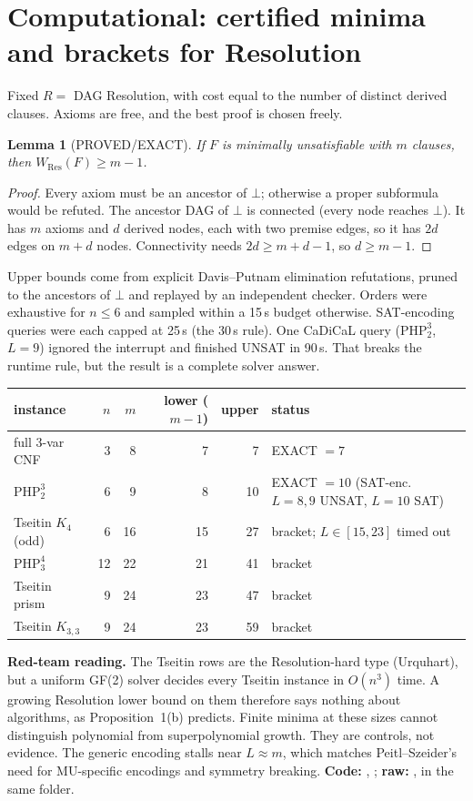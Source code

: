 \documentclass[11pt]{article}
\newtheorem{lemma}{Lemma}
\begin{document}
\section{Computational: certified minima and brackets for Resolution}
Fixed $R=$ DAG Resolution, with cost equal to the number of distinct derived clauses.
Axioms are free, and the best proof is chosen freely.
\begin{lemma}[PROVED/EXACT]
If $F$ is minimally unsatisfiable with $m$ clauses, then $W_{\mathrm{Res}}(F)\ge m-1$.
\end{lemma}
\begin{proof}
Every axiom must be an ancestor of $\bot$; otherwise a proper subformula would be
refuted. The ancestor DAG of $\bot$ is connected (every node reaches $\bot$).
It has $m$ axioms and $d$ derived nodes, each with two premise edges, so it has
$2d$ edges on $m+d$ nodes. Connectivity needs $2d\ge m+d-1$, so $d\ge m-1$.
\end{proof}
Upper bounds come from explicit Davis--Putnam elimination refutations, pruned to
the ancestors of $\bot$ and replayed by an independent checker. Orders were
exhaustive for $n\le 6$ and sampled within a 15\,s budget otherwise.
SAT-encoding queries were each capped at 25\,s (the 30\,s rule).
One CaDiCaL query ($\mathrm{PHP}^3_2$, $L=9$) ignored the interrupt and finished
UNSAT in 90\,s. That breaks the runtime rule, but the result is a complete solver answer.

\begin{center}
\begin{tabular}{lrrrrl}
\toprule
instance & $n$ & $m$ & lower ($m-1$) & upper & status\\
\midrule
full 3-var CNF & 3 & 8 & 7 & 7 & EXACT $=7$\\
$\mathrm{PHP}^3_2$ & 6 & 9 & 8 & 10 & EXACT $=10$ (SAT-enc.\ $L{=}8,9$ UNSAT, $L{=}10$ SAT)\\
Tseitin $K_4$ (odd) & 6 & 16 & 15 & 27 & bracket; $L\in[15,23]$ timed out\\
$\mathrm{PHP}^4_3$ & 12 & 22 & 21 & 41 & bracket\\
Tseitin prism & 9 & 24 & 23 & 47 & bracket\\
Tseitin $K_{3,3}$ & 9 & 24 & 23 & 59 & bracket\\
\bottomrule
\end{tabular}
\end{center}
\noindent\textbf{Red-team reading.} The Tseitin rows are the Resolution-hard
type (Urquhart), but a uniform GF(2) solver decides every Tseitin instance in
$O(n^3)$ time. A growing Resolution lower bound on them therefore says nothing
about algorithms, as Proposition~1(b) predicts. Finite minima at these sizes cannot
distinguish polynomial from superpolynomial growth. They are controls, not evidence.
The generic encoding stalls near $L\approx m$, which matches Peitl--Szeider's
need for MU-specific encodings and symmetry breaking.
\textbf{Code:} ,
;
\textbf{raw:} ,  in the same folder.
\end{document}
